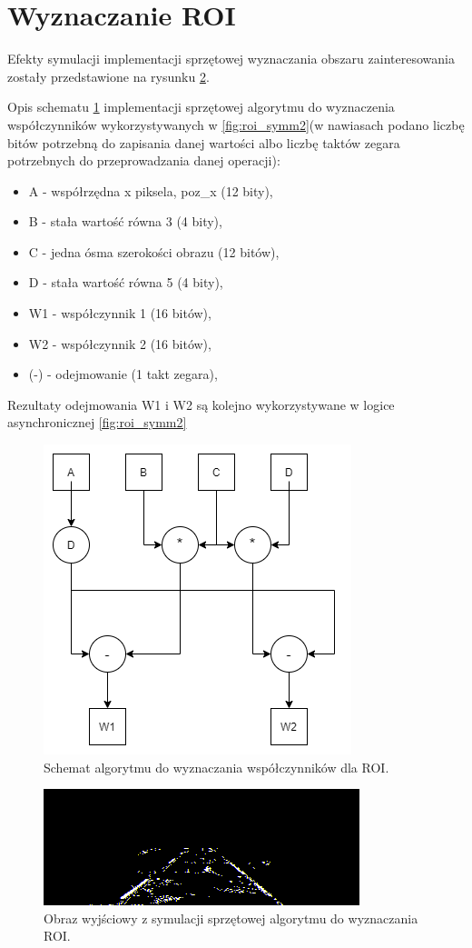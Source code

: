 \section{Wyznaczanie ROI}
Efekty symulacji implementacji sprzętowej wyznaczania obszaru zainteresowania zostały przedstawione na rysunku \ref{fig:roi_sym}.


Opis schematu \ref{fig:roi_symmm} implementacji sprzętowej algorytmu do wyznaczenia współczynników wykorzystywanych w \ref{fig:roi_symm2}(w nawiasach podano liczbę bitów potrzebną do zapisania danej wartości albo liczbę taktów zegara potrzebnych do przeprowadzania danej operacji):
\begin{itemize}
	\item A - współrzędna x piksela, poz\_x (12 bity),
	\item B - stała wartość równa 3 (4 bity),
	\item C - jedna ósma szerokości obrazu (12 bitów),
	\item D - stała wartość równa 5 (4 bity),
	\item W1 - współczynnik 1 (16 bitów),
	\item W2 - współczynnik 2 (16 bitów),
	\item (-) - odejmowanie (1 takt zegara),
\end{itemize}
Rezultaty odejmowania W1 i W2 są kolejno wykorzystywane w logice asynchronicznej \ref{fig:roi_symm2}
\begin{figure}[h]
	\centering
	\includegraphics[scale=0.5]{ROI_schem.png}
	\caption{Schemat algorytmu do wyznaczania współczynników dla ROI.}
	\label{fig:roi_symmm}
\end{figure}
\begin{figure}[h]
	\centering
	\includegraphics[scale=0.8]{obraz_roi_smal.png}
	\caption{Obraz wyjściowy z symulacji sprzętowej algorytmu do wyznaczania ROI.}
	\label{fig:roi_sym}
\end{figure}

